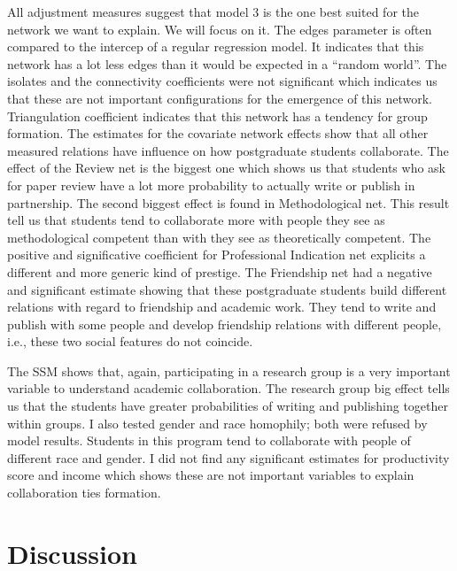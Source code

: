 \documentclass[a4paper, 12pt, openright, oneside, article, german, french, brazil, english]{abntex2}
\begin{document}
All adjustment measures suggest that model 3 is the one best suited for the network we want to explain. We will focus on it. The edges parameter is often compared to the intercep of a regular regression model. It indicates that this network has a lot less edges than it would be expected in a ``random world''. The isolates and the connectivity coefficients were not significant which indicates us that these are not important configurations for the emergence of this network. Triangulation coefficient indicates that this network has a tendency for group formation. The estimates for the covariate network effects show that all other measured relations have influence on how postgraduate students collaborate. The effect of the Review net is the biggest one which shows us that students who ask for paper review have a lot more probability to actually write or publish in partnership. The second biggest effect is found in Methodological net. This result tell us that students tend to collaborate more with people they see as methodological competent than with they see as theoretically competent. The positive and significative coefficient for Professional Indication net explicits a different and more generic kind of prestige. The Friendship net had a negative and significant estimate showing that these postgraduate students build different relations with regard to friendship and academic work. They tend to write and publish with some people and develop friendship relations with different people, i.e., these two social features do not coincide.

The SSM shows that, again, participating in a research group is a very important variable to understand academic collaboration. The research group big effect tells us that the students have greater probabilities of writing and publishing together within groups. I also tested gender and race homophily; both were refused by model results. Students in this program tend to collaborate with people of different race and gender. I did not find any significant estimates for productivity score and income which shows these are not important variables to explain collaboration ties formation.


\section{Discussion}
\end{document}
